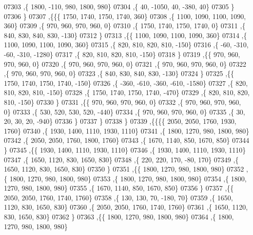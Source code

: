 \begin{DoxyCode}
07303     ,\{  1800,  -110,   980,  1800,   980\}
07304     ,\{    40, -1050,    40,  -380,    40\}
07305     \}
07306    \}
07307   ,\{\{\{  1750,  1740,  1750,  1740,   360\}
07308     ,\{  1100,  1090,  1100,  1090,   360\}
07309     ,\{   970,   960,   970,   960,     0\}
07310     ,\{  1750,  1740,  1750,  1740,     0\}
07311     ,\{   840,   830,   840,   830,  -130\}
07312     \}
07313    ,\{\{  1100,  1090,  1100,  1090,   360\}
07314     ,\{  1100,  1090,  1100,  1090,   360\}
07315     ,\{   820,   810,   820,   810,  -150\}
07316     ,\{   -60,  -310,   -60,  -310, -1280\}
07317     ,\{   820,   810,   820,   810,  -150\}
07318     \}
07319    ,\{\{   970,   960,   970,   960,     0\}
07320     ,\{   970,   960,   970,   960,     0\}
07321     ,\{   970,   960,   970,   960,     0\}
07322     ,\{   970,   960,   970,   960,     0\}
07323     ,\{   840,   830,   840,   830,  -130\}
07324     \}
07325    ,\{\{  1750,  1740,  1750,  1740,  -150\}
07326     ,\{  -360,  -610,  -360,  -610, -1580\}
07327     ,\{   820,   810,   820,   810,  -150\}
07328     ,\{  1750,  1740,  1750,  1740,  -470\}
07329     ,\{   820,   810,   820,   810,  -150\}
07330     \}
07331    ,\{\{   970,   960,   970,   960,     0\}
07332     ,\{   970,   960,   970,   960,     0\}
07333     ,\{   530,   520,   530,   520,  -440\}
07334     ,\{   970,   960,   970,   960,     0\}
07335     ,\{    30,    20,    30,    20,  -940\}
07336     \}
07337    \}
07338   \}
07339  ,\{\{\{\{  2050,  2050,  1760,  1930,  1760\}
07340     ,\{  1930,  1400,  1110,  1930,  1110\}
07341     ,\{  1800,  1270,   980,  1800,   980\}
07342     ,\{  2050,  2050,  1760,  1800,  1760\}
07343     ,\{  1670,  1140,   850,  1670,   850\}
07344     \}
07345    ,\{\{  1930,  1400,  1110,  1930,  1110\}
07346     ,\{  1930,  1400,  1110,  1930,  1110\}
07347     ,\{  1650,  1120,   830,  1650,   830\}
07348     ,\{   220,   220,   170,   -80,   170\}
07349     ,\{  1650,  1120,   830,  1650,   830\}
07350     \}
07351    ,\{\{  1800,  1270,   980,  1800,   980\}
07352     ,\{  1800,  1270,   980,  1800,   980\}
07353     ,\{  1800,  1270,   980,  1800,   980\}
07354     ,\{  1800,  1270,   980,  1800,   980\}
07355     ,\{  1670,  1140,   850,  1670,   850\}
07356     \}
07357    ,\{\{  2050,  2050,  1760,  1740,  1760\}
07358     ,\{   130,   130,    70,  -180,    70\}
07359     ,\{  1650,  1120,   830,  1650,   830\}
07360     ,\{  2050,  2050,  1760,  1740,  1760\}
07361     ,\{  1650,  1120,   830,  1650,   830\}
07362     \}
07363    ,\{\{  1800,  1270,   980,  1800,   980\}
07364     ,\{  1800,  1270,   980,  1800,   980\}

\end{DoxyCode}
